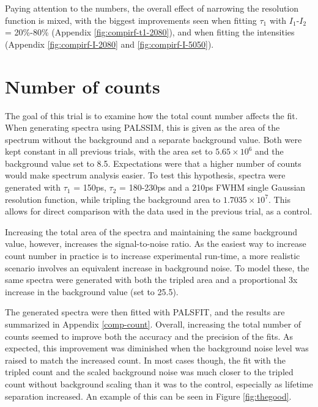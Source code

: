 Paying attention to the numbers, the overall effect of narrowing the resolution function is mixed, with the biggest improvements seen when fitting $\tau_1$ with $I_1$-$I_2$ = 20\%-80\% (Appendix \ref{fig:compirf-t1-2080}), and when fitting the intensities (Appendix \ref{fig:compirf-I-2080} and \ref{fig:compirf-I-5050}).

\section{Number of counts}

The goal of this trial is to examine how the total count number affects the fit. When generating spectra using PALSSIM, this is given as the area of the spectrum without the background and a separate background value. Both were kept constant in all previous trials, with the area set to $5.65 \times 10^6$ and the background value set to 8.5. Expectations were that a higher number of counts would make spectrum analysis easier. To test this hypothesis, spectra were generated with $\tau_1$ = 150ps, $\tau_2$ = 180-230ps and a 210ps FWHM single Gaussian resolution function, while tripling the background area to $1.7035 \times 10^7$. This allows for direct comparison with the data used in the previous trial, as a control.

Increasing the total area of the spectra and maintaining the same background value, however, increases the signal-to-noise ratio. As the easiest way to increase count number in practice is to increase experimental run-time, a more realistic scenario involves an equivalent increase in background noise. To model these, the same spectra were generated with both the tripled area and a proportional 3x increase in the background value (set to 25.5).

The generated spectra were then fitted with PALSFIT, and the results are summarized in Appendix \ref{comp-count}. Overall, increasing the total number of counts seemed to improve both the accuracy and the precision of the fits. As expected, this improvement was diminished when the background noise level was raised to match the increased count. In most cases though, the fit with the tripled count and the scaled background noise was much closer to the tripled count without background scaling than it was to the control, especially as lifetime separation increased. An example of this can be seen in Figure \ref{fig:thegood}.

